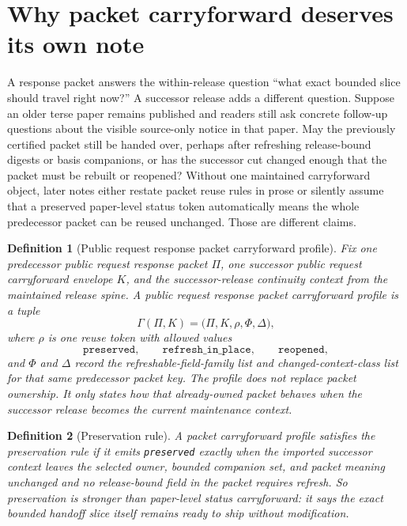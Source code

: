\documentclass[11pt]{article}
\newtheorem{definition}{Definition}
\begin{document}
\section{Why packet carryforward deserves its own note}
A response packet answers the within-release question ``what exact bounded slice should travel right now?''
A successor release adds a different question.
Suppose an older terse paper remains published and readers still ask concrete follow-up questions about the visible source-only notice in that paper.
May the previously certified packet still be handed over, perhaps after refreshing release-bound digests or basis companions, or has the successor cut changed enough that the packet must be rebuilt or reopened?
Without one maintained carryforward object, later notes either restate packet reuse rules in prose or silently assume that a preserved paper-level status token automatically means the whole predecessor packet can be reused unchanged.
Those are different claims.

\begin{definition}[Public request response packet carryforward profile]
Fix one predecessor public request response packet $\Pi$, one successor public request carryforward envelope $K$, and the successor-release continuity context from the maintained release spine.
A \emph{public request response packet carryforward profile} is a tuple
\[
\Gamma(\Pi,K)=\bigl(\Pi,K,\rho,\Phi,\Delta\bigr),
\]
where $\rho$ is one reuse token with allowed values
\[
\texttt{preserved},\qquad \texttt{refresh\_in\_place},\qquad \texttt{reopened},
\]
and $\Phi$ and $\Delta$ record the refreshable-field-family list and changed-context-class list for that same predecessor packet key.
The profile does not replace packet ownership.
It only states how that already-owned packet behaves when the successor release becomes the current maintenance context.
\end{definition}

\begin{definition}[Preservation rule]
A packet carryforward profile satisfies the \emph{preservation rule} if it emits \texttt{preserved} exactly when the imported successor context leaves the selected owner, bounded companion set, and packet meaning unchanged and no release-bound field in the packet requires refresh.
So preservation is stronger than paper-level status carryforward: it says the exact bounded handoff slice itself remains ready to ship without modification.
\end{definition}
\end{document}
